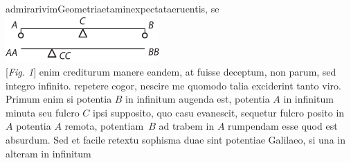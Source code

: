 \hfill
{}admirari\hfill vim\hfill Geometriae\hfill tam\hfill inexpectata\hfill eruentis,\hfill
se
\pend
\vspace{1.5em}
\pstart
\centering
\noindent
\includegraphics[trim = 0mm -2mm 0mm 0mm, clip,width=0.44\textwidth]{images/lh03705_201r-d1.pdf}\\
\centering
[\textit{Fig. 1}]
\pend
\count{}
\count{}
\count{}
\newpage
\pstart
\noindent
enim crediturum
manere eandem, at fuisse deceptum, non parum, sed integro infinito.
repetere cogor, nescire me quomodo talia exciderint tanto viro.
Primum enim si potentia $B$ in infinitum augenda est, potentia $A$ in infinitum minuta seu fulcro $C$ ipsi supposito, quo casu  evanescit, sequetur fulcro\protect{} posito in $A$ potentia $A$ remota, potentiam\ $B$ ad trabem\protect{} in $A$ rumpendam esse
quod est absurdum. Sed et facile retextu sophisma
duae sint potentiae 
Galilaeo,\protect{}
si 
una in 
alteram in infinitum
%
